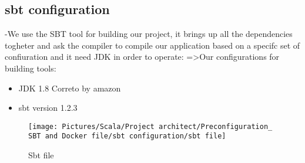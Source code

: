 \begin{spacing}{1.2}
\newpage
\subsection{sbt configuration }
\par -We use the SBT tool for building our project, it brings up all the dependencies togheter and ask the compiler to compile our application based on a specifc set of confiuration and it need JDK in order to operate:\newline
=>Our configurations for building tools:

\begin{itemize}
  \item JDK 1.8 Correto by amazon
  \item sbt version 1.2.3
\end{itemize}
\vspace{1cm}
\begin{figure}[!htb] 
\begin{center} 
\texttt{[image: Pictures/Scala/Project architect/Preconfiguration\_ SBT and Docker file/sbt configuration/sbt file]} 
\end{center} 
\caption{Sbt file} 
\end{figure}  \FloatBarrier
\vspace{1cm}

	
	
		



\end{spacing}